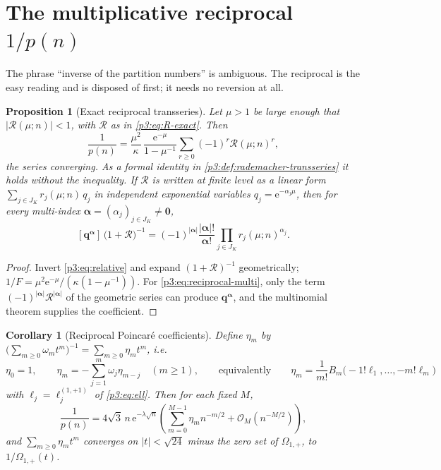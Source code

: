 \documentclass[11pt,a4paper,oneside]{book}
\theoremstyle{plain}
\newtheorem{proposition}[theorem]{Proposition}
\newtheorem{corollary}[theorem]{Corollary}
\theoremstyle{definition}
\theoremstyle{remark}
\newcommand{\e}{\mathrm{e}}
\newcommand{\Coef}[1]{[#1]\,}
\newcommand{\bigO}{\mathcal{O}}
\newcommand{\EB}{B}
\begin{document}
\section{The multiplicative reciprocal \texorpdfstring{$1/p(n)$}{1/p(n)}}
\label{p3:sec:reciprocal}

The phrase ``inverse of the partition numbers'' is ambiguous. The reciprocal is the easy reading
and is disposed of first; it needs no reversion at all.

\begin{proposition}[Exact reciprocal transseries]\label{p3:prop:reciprocal}
Let $\mu>1$ be large enough that $|\mathcal{R}(\mu;n)|<1$, with $\mathcal{R}$ as in
\cref{p3:eq:R-exact}. Then
\begin{equation}\label{p3:eq:reciprocal}
 \frac1{p(n)}=\frac{\mu^{2}}{\kappa}\,\frac{\e^{-\mu}}{1-\mu^{-1}}
 \sum_{r\ge0}(-1)^{r}\mathcal{R}(\mu;n)^{r},
\end{equation}
the series converging. As a formal identity in \cref{p3:def:rademacher-transseries} it holds
without the inequality. If $\mathcal{R}$ is written at finite level as a linear form $\sum_{j\in
J_{K}}r_{j}(\mu;n)\,q_{j}$ in independent exponential variables $q_{j}=\e^{-\alpha_{j}\mu}$, then
for every multi-index $\boldsymbol\alpha=(\alpha_{j})_{j\in J_{K}}\ne\boldsymbol0$,
\begin{equation}\label{p3:eq:reciprocal-multi}
 \Coef{\boldsymbol q^{\boldsymbol\alpha}}\bigl(1+\mathcal{R}\bigr)^{-1}
 =(-1)^{|\boldsymbol\alpha|}\frac{|\boldsymbol\alpha|!}{\boldsymbol\alpha!}
 \prod_{j\in J_{K}}r_{j}(\mu;n)^{\alpha_{j}} .
\end{equation}
\end{proposition}

\begin{proof}
Invert \cref{p3:eq:relative} and expand $(1+\mathcal{R})^{-1}$ geometrically;
$1/F=\mu^{2}\e^{-\mu}/(\kappa(1-\mu^{-1}))$. For \cref{p3:eq:reciprocal-multi}, only the term
$(-1)^{|\boldsymbol\alpha|} \mathcal{R}^{|\boldsymbol\alpha|}$ of the geometric series can produce
$\boldsymbol q^{\boldsymbol\alpha}$, and the multinomial theorem supplies the coefficient.
\end{proof}

\begin{corollary}[Reciprocal Poincar\'e coefficients]\label{p3:cor:reciprocal-poincare}
Define $\eta_{m}$ by $\bigl(\sum_{m\ge0}\omega_{m}t^{m}\bigr)^{-1} =\sum_{m\ge0}\eta_{m}t^{m}$,
i.e.
\begin{equation}\label{p3:eq:eta}
 \eta_{0}=1,\qquad \eta_{m}=-\sum_{j=1}^{m}\omega_{j}\eta_{m-j}
 \quad(m\ge1),
 \qquad\text{equivalently}\qquad
 \eta_{m}=\frac1{m!}\EB_{m}\bigl(-1!\ell_{1},\dots,-m!\ell_{m}\bigr)
\end{equation}
with $\ell_{j}=\ell_{j}^{(1,+1)}$ of \cref{p3:eq:ell}. Then for each fixed $M$,
\begin{equation}\label{p3:eq:reciprocal-poincare}
 \frac1{p(n)}=4\sqrt3\,n\,\e^{-\lambda\sqrt n}
 \left(\sum_{m=0}^{M-1}\eta_{m}n^{-m/2}+\bigO_{M}(n^{-M/2})\right),
\end{equation}
and $\sum_{m\ge0}\eta_{m}t^{m}$ converges on $|t|<\sqrt{24}$ minus the zero set of $\Omega_{1,+}$,
to $1/\Omega_{1,+}(t)$.
\end{corollary}
\end{document}
